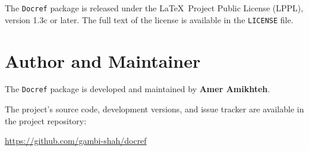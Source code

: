 \documentclass{article}
\begin{document}
The \texttt{Docref} package is released under the
\LaTeX~Project Public License (LPPL),
version 1.3c or later.
The full text of the license is available in the \texttt{LICENSE} file.

\section{Author and Maintainer}

The \texttt{Docref} package is developed and maintained by
\textbf{Amer Amikhteh}.

The project's source code, development versions, and issue tracker are
available in the project repository:

\begin{center}
    \url{https://github.com/gambi-shah/docref}
\end{center}
\end{document}
